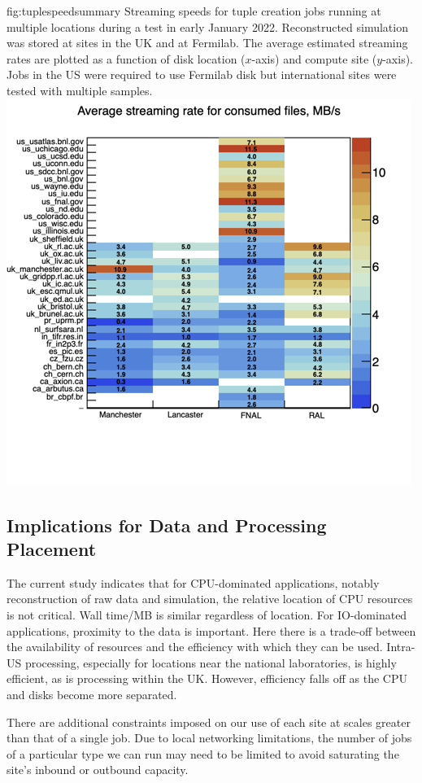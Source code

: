 \documentclass[../main-v1.tex]{subfiles}
\begin{document}
{\begin{dunefigure}
{fig:tuplespeedsummary} 
{Streaming speeds for tuple creation jobs running at multiple locations during a test in early January 2022. Reconstructed simulation was stored at sites in the UK and at Fermilab.  The average estimated streaming rates are plotted as a function of disk location ($x$-axis) and compute site ($y$-axis). Jobs in the US were required to use Fermilab disk but international sites were tested with multiple samples.}
\includegraphics[width=0.8 \textwidth]{graphics/Workflow/fastRates.png}
\end{dunefigure}

\subsection{Implications for Data and Processing Placement}

The current study indicates that for CPU-dominated applications, notably reconstruction of raw data and simulation, the relative location of CPU resources is not critical. Wall time/MB   is similar regardless of location. For IO-dominated applications, proximity to the data is important.  Here there is a trade-off between the availability of resources and the efficiency with which they can be used. Intra-US processing, especially for locations near the national laboratories, is highly efficient, as is processing within the UK.  However, efficiency falls off as the CPU and disks become more separated.  

There are additional constraints imposed on our use of each site at scales greater than that of a single job. Due to local networking limitations, the number of jobs of a particular type we can run may need to be limited to avoid saturating the site's inbound or outbound capacity. 

}
\end{document}
